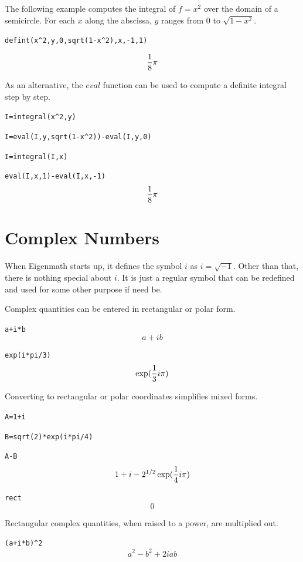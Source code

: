 \documentclass[12pt]{book}
\begin{document}
\medskip
\noindent
The following example computes the integral of $f=x^2$
over the domain of a semicircle.
For each $x$ along the abscissa, $y$ ranges from 0 to $\sqrt{1-x^2}$.

\medskip
\verb$defint(x^2,y,0,sqrt(1-x^2),x,-1,1)$

$${1\over8}\pi$$

\medskip
\noindent
As an alternative, the $eval$ function can be used to compute a definite integral step by step.

\medskip
\verb$I=integral(x^2,y)$

\verb$I=eval(I,y,sqrt(1-x^2))-eval(I,y,0)$

\verb$I=integral(I,x)$

\verb$eval(I,x,1)-eval(I,x,-1)$
$${1\over8}\pi$$









\newpage

\chapter{Complex Numbers}

\noindent
When Eigenmath starts up, it defines the symbol $i$ as $i=\sqrt{-1}$.
Other than that, there is nothing special about $i$.
It is just a regular symbol that can be redefined and used for some other purpose if need be.

\medskip
\noindent
Complex quantities can be entered in rectangular or polar form.

\medskip
\verb$a+i*b$
$$a+ib$$

\verb$exp(i*pi/3)$
$$\exp({1\over3}i\pi)$$

\medskip
\noindent
Converting to rectangular or polar coordinates simplifies mixed forms.

\medskip
\verb$A=1+i$

\verb$B=sqrt(2)*exp(i*pi/4)$

\verb$A-B$
$$1+i-2^{1/2}\exp({1\over4}i\pi)$$

\verb$rect$
$$0$$

\newpage

\noindent
Rectangular complex quantities, when raised to a power, are multiplied out.

\medskip
\verb$(a+i*b)^2$
$$a^2-b^2+2iab$$
\end{document}
